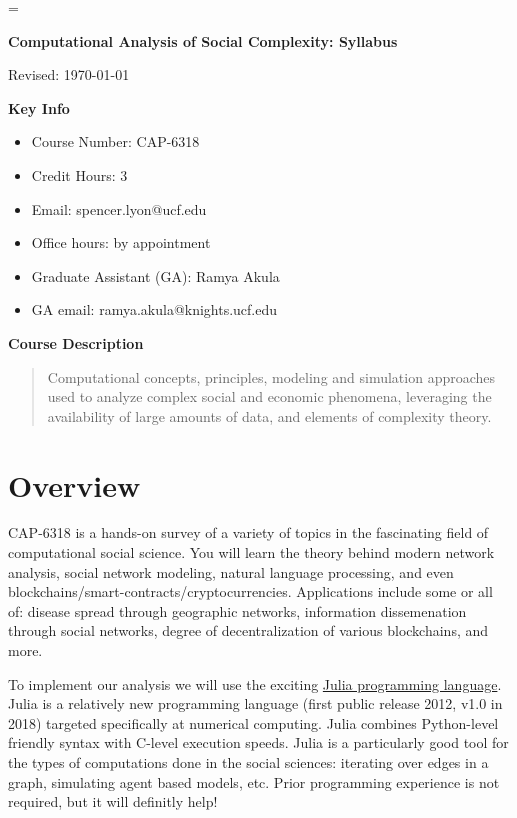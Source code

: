 \documentclass[11pt]{article}
\begin{document}
\parskip=\bigskipamount
\parindent=0.0in
\thispagestyle{empty}


\bigskip\bigskip
\centerline{\Large \bf Computational Analysis of Social Complexity:  Syllabus}
\centerline{Revised: \today}

\textbf{Key Info}

\begin{itemize}[label={}]
    \setlength\itemsep{0.2em}
    \item Course Number:  CAP-6318
    \item Credit Hours: 3
    \item Email: spencer.lyon@ucf.edu
    \item Office hours: by appointment
    \item Graduate Assistant (GA): Ramya Akula
    \item GA email: ramya.akula@knights.ucf.edu
\end{itemize}

\textbf{Course Description}
\begin{quote}
    Computational concepts, principles, modeling and simulation approaches used
    to analyze complex social and economic phenomena, leveraging the
    availability of large amounts of data, and elements of complexity theory.
\end{quote}


\section*{Overview}

CAP-6318 is a hands-on survey of a variety of topics in the fascinating field of
computational social science. You will learn the theory behind modern network
analysis, social network modeling, natural language processing, and even
blockchains/smart-contracts/cryptocurrencies.  Applications include some or all
of: disease spread through geographic networks, information dissemenation
through social networks, degree of decentralization of various blockchains, and
more.

To implement our analysis we will use the exciting
\href{https://julialang.org}{Julia programming language}. Julia is a relatively
new programming language (first public release 2012, v1.0 in 2018) targeted
specifically at numerical computing. Julia combines Python-level friendly syntax
with C-level execution speeds. Julia is a particularly good tool for the types
of computations done in the social sciences: iterating over edges in a graph,
simulating agent based models, etc. Prior programming experience is not
required, but it will definitly help!
\end{document}
